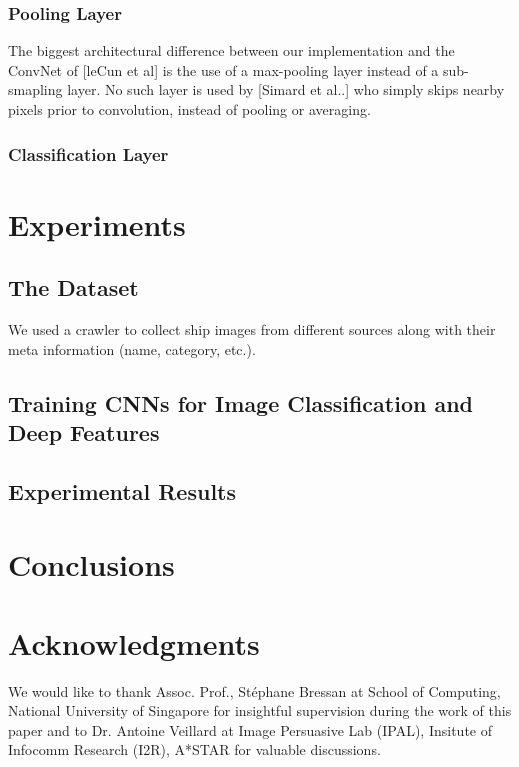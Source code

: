 \documentclass{sig-alternate}
\begin{document}
       \subsubsection{Pooling Layer}
       The biggest architectural difference between our implementation and the ConvNet of [leCun et al] is the use of a max-pooling layer instead of a sub-smapling layer. No such layer is used by [Simard et al..] who simply skips nearby pixels prior to convolution, instead of pooling or averaging. 
       \subsubsection{Classification Layer}
\section{Experiments}
\subsection{The Dataset}
We used a crawler to collect ship images from different sources along with their meta information (name, category, etc.).
\subsection{Training CNNs for Image Classification and Deep Features}
\subsection{Experimental Results}
\section{Conclusions}


\section{Acknowledgments}
We would like to thank Assoc. Prof., St\'{e}phane Bressan at School of Computing, National University of Singapore for insightful supervision during the work of this paper and to Dr. Antoine Veillard at Image Persuasive Lab (IPAL), Insitute of Infocomm Research (I2R), A*STAR for valuable discussions. 
\end{document}
